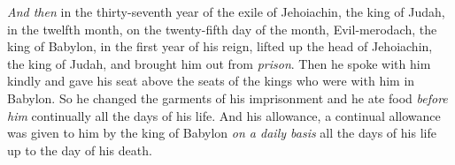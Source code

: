 \begin{biblechapter}
 \textit{And then} in the thirty-seventh year of the exile of Jehoiachin, the king of Judah, in the twelfth month, on the twenty-fifth day of the month, Evil-merodach, the king of Babylon, in the first year of his reign, lifted up the head of Jehoiachin, the king of Judah, and brought him out from \textit{prison}.
\verse Then he spoke with him kindly and gave his seat above the seats of the kings who were with him in Babylon.
\verse So he changed the garments of his imprisonment and he ate food \textit{before him} continually all the days of his life.
\verse And his allowance, a continual allowance was given to him by the king of Babylon \textit{on a daily basis} all the days of his life up to the day of his death.
\end{biblechapter}

